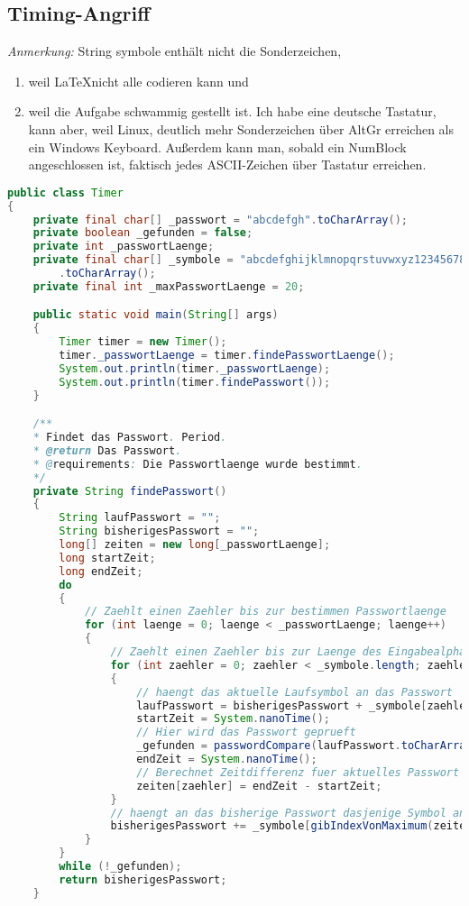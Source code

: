\documentclass[twoside]{article}
\begin{document}
	\subsection*{Timing-Angriff}
		\label{timing}
		\textit{Anmerkung:} String \textunderscore symbole enthält nicht die Sonderzeichen,
		\begin{enumerate}
			\item weil \LaTeX nicht alle codieren kann und
			\item weil die Aufgabe schwammig gestellt ist.
					Ich habe eine deutsche Tastatur, kann aber, weil Linux, deutlich mehr Sonderzeichen über AltGr erreichen als ein Windows Keyboard.
					Außerdem kann man, sobald ein NumBlock angeschlossen ist, faktisch jedes ASCII-Zeichen über Tastatur erreichen.
		\end{enumerate}
\begin{lstlisting}[language=Java]
public class Timer
{
	private final char[] _passwort = "abcdefgh".toCharArray();
	private boolean _gefunden = false;
	private int _passwortLaenge;
	private final char[] _symbole = "abcdefghijklmnopqrstuvwxyz1234567890"
    	.toCharArray();
	private final int _maxPasswortLaenge = 20;

	public static void main(String[] args)
	{
    	Timer timer = new Timer();
    	timer._passwortLaenge = timer.findePasswortLaenge();
    	System.out.println(timer._passwortLaenge);
    	System.out.println(timer.findePasswort());
	}

	/**
 	* Findet das Passwort. Period.
 	* @return Das Passwort.
 	* @requirements: Die Passwortlaenge wurde bestimmt.
 	*/
	private String findePasswort()
	{
    	String laufPasswort = "";
    	String bisherigesPasswort = "";
    	long[] zeiten = new long[_passwortLaenge];
    	long startZeit;
    	long endZeit;
    	do
    	{
        	// Zaehlt einen Zaehler bis zur bestimmen Passwortlaenge
        	for (int laenge = 0; laenge < _passwortLaenge; laenge++)
        	{
            	// Zaehlt einen Zaehler bis zur Laenge des Eingabealphabets
            	for (int zaehler = 0; zaehler < _symbole.length; zaehler++)
            	{
                	// haengt das aktuelle Laufsymbol an das Passwort
                	laufPasswort = bisherigesPasswort + _symbole[zaehler];
                	startZeit = System.nanoTime();
                	// Hier wird das Passwort geprueft
                	_gefunden = passwordCompare(laufPasswort.toCharArray(), _passwort);
                	endZeit = System.nanoTime();
                	// Berechnet Zeitdifferenz fuer aktuelles Passwort
                	zeiten[zaehler] = endZeit - startZeit;
            	}
            	// haengt an das bisherige Passwort dasjenige Symbol an, fuer welches die groesste Zeit gebraucht wurde
            	bisherigesPasswort += _symbole[gibIndexVonMaximum(zeiten)];
        	}
    	}
    	while (!_gefunden);
    	return bisherigesPasswort;
	}


\end{lstlisting}
\end{document}
